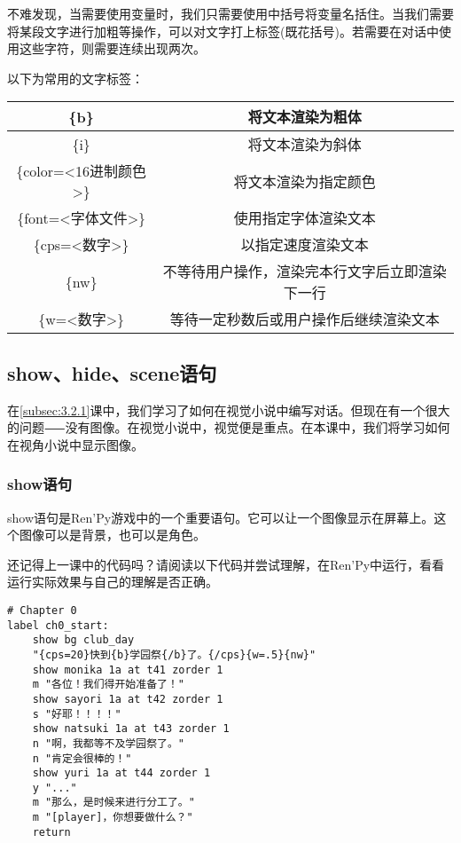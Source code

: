 不难发现，当需要使用变量时，我们只需要使用中括号将变量名括住。当我们需要将某段文字进行加粗等操作，可以对文字打上标签(既花括号)。若需要在对话中使用这些字符，则需要连续出现两次。

以下为常用的文字标签：
\begin{center}
    \tabletail{\hline}
    \tablelasttail{\hline}
    \begin{supertabular}{|c|c|}
        \hline
        \{b\} & 将文本渲染为粗体 \\
        \hline
        \{i\} & 将文本渲染为斜体 \\
        \hline
        \{color=<16进制颜色>\} & 将文本渲染为指定颜色 \\
        \hline
        \{font=<字体文件>\} & 使用指定字体渲染文本 \\
        \hline
        \{cps=<数字>\} & 以指定速度渲染文本 \\
        \hline
        \{nw\} & 不等待用户操作，渲染完本行文字后立即渲染下一行 \\
        \hline
        \{w=<数字>\} & 等待一定秒数后或用户操作后继续渲染文本 \\
        \hline
    \end{supertabular}
    \label{table:3.2.1}
\end{center}

\subsection{show、hide、scene语句}

在\ref{subsec:3.2.1}课中，我们学习了如何在视觉小说中编写对话。但现在有一个很大的问题⸺没有图像。在视觉小说中，视觉便是重点。在本课中，我们将学习如何在视角小说中显示图像。

\subsubsection{show语句}

show语句是Ren'Py游戏中的一个重要语句。它可以让一个图像显示在屏幕上。这个图像可以是背景，也可以是角色。

还记得上一课中的代码吗？请阅读以下代码并尝试理解，在Ren'Py中运行，看看运行实际效果与自己的理解是否正确。

\begin{lstlisting}[caption=script-ch1.rpy, label={lst:2.3}]
# Chapter 0
label ch0_start:
    show bg club_day
    "{cps=20}快到{b}学园祭{/b}了。{/cps}{w=.5}{nw}"
    show monika 1a at t41 zorder 1
    m "各位！我们得开始准备了！"
    show sayori 1a at t42 zorder 1
    s "好耶！！！！"
    show natsuki 1a at t43 zorder 1
    n "啊，我都等不及学园祭了。"
    n "肯定会很棒的！"
    show yuri 1a at t44 zorder 1
    y "..."
    m "那么，是时候来进行分工了。"
    m "[player]，你想要做什么？"
    return
\end{lstlisting}

